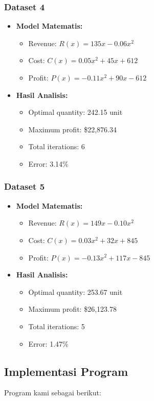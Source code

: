 \documentclass[conference]{IEEEtran}
\begin{document}
\subsubsection{Dataset 4}
\begin{itemize}
\item \textbf{Model Matematis:}
\begin{itemize}
\item Revenue: $R(x) = 135x - 0.06x^2$
\item Cost: $C(x) = 0.05x^2 + 45x + 612$
\item Profit: $P(x) = -0.11x^2 + 90x - 612$
\end{itemize}
\item \textbf{Hasil Analisis:}
\begin{itemize}
\item Optimal quantity: 242.15 unit
\item Maximum profit: \$22,876.34
\item Total iterations: 6
\item Error: 3.14\%
\end{itemize}
\end{itemize}

\subsubsection{Dataset 5}
\begin{itemize}
\item \textbf{Model Matematis:}
\begin{itemize}
\item Revenue: $R(x) = 149x - 0.10x^2$
\item Cost: $C(x) = 0.03x^2 + 32x + 845$
\item Profit: $P(x) = -0.13x^2 + 117x - 845$
\end{itemize}
\item \textbf{Hasil Analisis:}
\begin{itemize}
\item Optimal quantity: 253.67 unit
\item Maximum profit: \$26,123.78
\item Total iterations: 5
\item Error: 1.47\%
\end{itemize}
\end{itemize}

\subsection{Implementasi Program}
Program kami sebagai berikut:
\end{document}
